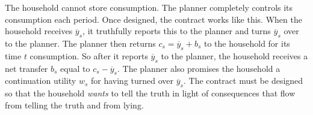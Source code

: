The household cannot store consumption.  The planner completely  controls its consumption each period.
Once designed, the contract works like this.  When the household receives $\overline y_s$, it
truthfully reports this to the planner and turns $\overline y_s$ over to the planner.    The planner
then returns $c_s = \overline y_s + b_s$ to the household for its time $t$ consumption. So after it reports $\overline y_s$
to the planner, the household
receives a net transfer $b_s$ equal to $c_s - \overline y_s$.  The planner also promises the 
household a continuation utility $w_s$ for having turned over $\overline y_s$.  
The contract must be designed so that the household {\it wants\/} to tell the truth in light of consequences
that flow from telling the truth and from lying.



